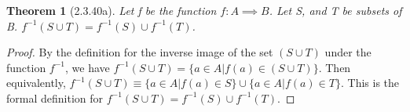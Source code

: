 \documentclass[a4paper, 12pt]{article}
\theoremstyle{plain}
\newtheorem*{theorem*}{Theorem}
\begin{document}
	
	\begin{theorem*}[2.3.40a]
		Let f be the function $f: A \implies B$. Let S, and T be subsets of B. 
		$f^{-1}(S \cup T) = f^{-1}(S) \cup f^{-1}(T)$.
	\end{theorem*}
	
	\begin{proof}
		By the definition for the inverse image of the set $(S \cup T)$ under the function 
		$f^{-1}$, we have $f^{-1}(S \cup T) = \{a \in A | f(a) \in (S \cup T)\}$. Then 
		equivalently, 
		$f^{-1}(S \cup T) \equiv \{a \in A | f(a) \in S\} \cup \{a \in A | f(a) \in T\}$. 
		This is the formal definition for $f^{-1}(S \cup T) = f^{-1}(S) \cup f^{-1}(T)$.
	\end{proof}
\end{document}
